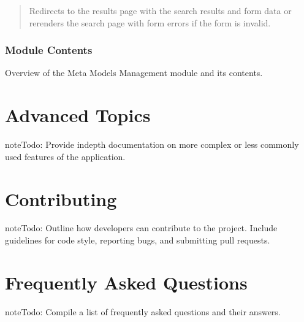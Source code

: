 \documentclass[letterpaper,10pt,english]{sphinxmanual}
\begin{document}
\begin{fulllineitems}
\begin{fulllineitems}
\begin{quote}
\begin{description}
\begin{itemize}
\end{itemize}

\sphinxAtStartPar
{} \textendash{} Redirects to the results page with the search results and form data or
re\sphinxhyphen{}renders the search page with form errors if the form is invalid.

\end{description}\end{quote}

\end{fulllineitems}


\end{fulllineitems}



\subsection{Module Contents}
\label{\detokenize{source/meta_models_management:module-contents}}
\sphinxAtStartPar
Overview of the Meta Models Management module and its contents.
\label{\detokenize{source/meta_models_management:module-meta_models_management}}

\chapter{Advanced Topics}
\label{\detokenize{index:advanced-topics}}
\begin{sphinxadmonition}{note}{\label{\detokenize{index:id2}}Todo:}
\sphinxAtStartPar
Provide in\sphinxhyphen{}depth documentation on more complex or less commonly used features of the application.
\end{sphinxadmonition}


\chapter{Contributing}
\label{\detokenize{index:contributing}}
\begin{sphinxadmonition}{note}{\label{\detokenize{index:id3}}Todo:}
\sphinxAtStartPar
Outline how developers can contribute to the project. Include guidelines for code style, reporting bugs, and submitting pull requests.
\end{sphinxadmonition}


\chapter{Frequently Asked Questions}
\label{\detokenize{index:frequently-asked-questions}}
\begin{sphinxadmonition}{note}{\label{\detokenize{index:id4}}Todo:}
\sphinxAtStartPar
Compile a list of frequently asked questions and their answers.
\end{sphinxadmonition}
\end{document}
